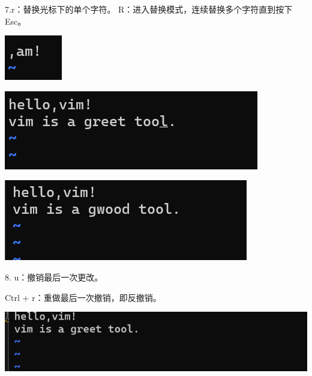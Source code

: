 \documentclass{article}
\begin{document}
	7.r：替换光标下的单个字符。
	R：进入替换模式，连续替换多个字符直到按下 Esc。
	
	
	\noindent
	\begin{minipage}{\linewidth}
		\centering
		\includegraphics[width=0.5\linewidth]{example17.png}
		\label{fig:example}
	\end{minipage}
	
	\noindent
	\begin{minipage}{\linewidth}
		\centering
		\includegraphics[width=0.5\linewidth]{example18.png}
		\label{fig:example}
	\end{minipage}
	
	\noindent
	\begin{minipage}{\linewidth}
		\centering
		\includegraphics[width=0.5\linewidth]{example19.png}
		\label{fig:example}
	\end{minipage}
	
	8. 
	u：撤销最后一次更改。
	
	Ctrl + r：重做最后一次撤销，即反撤销。
	
	
	\begin{minipage}{\linewidth}
		\centering
		\includegraphics[width=0.5\linewidth]{example20.png}
		\label{fig:example}
	\end{minipage}
	
\end{document}
